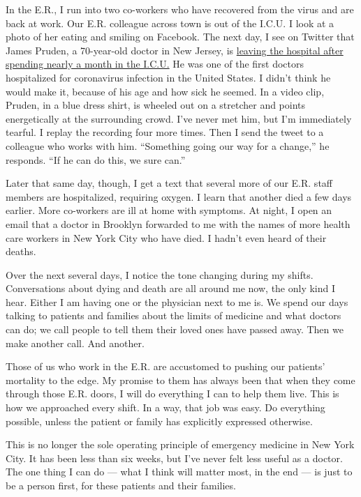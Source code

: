 In the E.R., I run into two co-workers who have recovered from the virus
and are back at work. Our E.R. colleague across town is out of the
I.C.U. I look at a photo of her eating and smiling on Facebook. The next
day, I see on Twitter that James Pruden, a 70-year-old doctor in New
Jersey, is
\href{https://twitter.com/emswami/status/1247966879110631425}{leaving
the hospital after spending nearly a month in the I.C.U.} He was one of
the first doctors hospitalized for coronavirus infection in the United
States. I didn't think he would make it, because of his age and how sick
he seemed. In a video clip, Pruden, in a blue dress shirt, is wheeled
out on a stretcher and points energetically at the surrounding crowd.
I've never met him, but I'm immediately tearful. I replay the recording
four more times. Then I send the tweet to a colleague who works with
him. ``Something going our way for a change,'' he responds. ``If he can
do this, we sure can.''

Later that same day, though, I get a text that several more of our E.R.
staff members are hospitalized, requiring oxygen. I learn that another
died a few days earlier. More co-workers are ill at home with symptoms.
At night, I open an email that a doctor in Brooklyn forwarded to me with
the names of more health care workers in New York City who have died. I
hadn't even heard of their deaths.

Over the next several days, I notice the tone changing during my shifts.
Conversations about dying and death are all around me now, the only kind
I hear. Either I am having one or the physician next to me is. We spend
our days talking to patients and families about the limits of medicine
and what doctors can do; we call people to tell them their loved ones
have passed away. Then we make another call. And another.

Those of us who work in the E.R. are accustomed to pushing our patients'
mortality to the edge. My promise to them has always been that when they
come through those E.R. doors, I will do everything I can to help them
live. This is how we approached every shift. In a way, that job was
easy. Do everything possible, unless the patient or family has
explicitly expressed otherwise.

This is no longer the sole operating principle of emergency medicine in
New York City. It has been less than six weeks, but I've never felt less
useful as a doctor. The one thing I can do --- what I think will matter
most, in the end --- is just to be a person first, for these patients
and their families.

